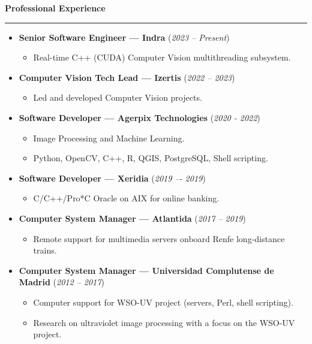 \documentclass[10pt,a4paper]{article}
\newcommand{\sect}[1]{\vspace{6pt}\noindent\textbf{\large #1}\vspace{2pt}\hrule\vspace{6pt}}
\newcommand{\subsect}[1]{\vspace{4pt}\textbf{#1}}
\begin{document}
\sect{Professional Experience}
\begin{itemize}[leftmargin=*]
  
\item \subsect{Senior Software Engineer — Indra} (\textit{2023 – Present})
\begin{itemize}[leftmargin=*,label={}]
\item Real-time C++ (CUDA) Computer Vision multithreading subsystem.
\end{itemize}
  
\item \subsect{Computer Vision Tech Lead — Izertis} (\textit{2022 – 2023})
\begin{itemize}[leftmargin=*,label={}]
\item Led and developed Computer Vision projects.
\end{itemize}

\item \subsect{Software Developer — Agerpix Technologies} (\textit{2020 - 2022})
\begin{itemize}[leftmargin=*,label={}]
    \item Image Processing and Machine Learning.
    \item Python, OpenCV, C++, R, QGIS, PostgreSQL, Shell scripting.
\end{itemize}

\item \subsect{Software Developer — Xeridia} (\textit{2019 –- 2019})
\begin{itemize}[leftmargin=*,label={}]
    \item C/C++/Pro*C Oracle on AIX for online banking.
\end{itemize}

\item \subsect{Computer System Manager — Atlantida} (\textit{2017 – 2019})
\begin{itemize}[leftmargin=*,label={}]
\item Remote support for multimedia servers onboard Renfe long-distance trains.
\end{itemize}

\item \subsect{Computer System Manager — Universidad Complutense de Madrid} (\textit{2012 – 2017})
\begin{itemize}[leftmargin=*,label={}]
    \item Computer support for WSO-UV project (servers, Perl, shell scripting).
    \item Research on ultraviolet image processing with a focus on the WSO-UV project.
\end{itemize}


\end{itemize}
\end{document}

